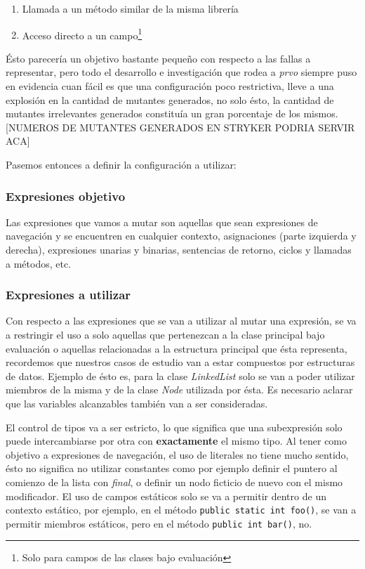 \begin{enumerate}[label=\arabic*), leftmargin=.75cm,align=left]
	\item Llamada a un m\'etodo similar de la misma librer\'ia
	\item Acceso directo a un campo\footnote{Solo para campos de las clases bajo evaluaci\'on}
\end{enumerate}

\'Esto parecer\'ia un objetivo bastante peque\~no con respecto a las fallas a representar, pero todo el desarrollo e investigaci\'on que rodea a \emph{prvo} siempre puso en evidencia cuan f\'acil es que una configuraci\'on poco restrictiva, lleve a una explosi\'on en la cantidad de mutantes generados, no solo \'esto, la cantidad de mutantes irrelevantes generados constitu\'ia un gran porcentaje de los mismos. [NUMEROS DE MUTANTES GENERADOS EN STRYKER PODRIA SERVIR ACA]

Pasemos entonces a definir la configuraci\'on a utilizar:

\subsubsection{Expresiones objetivo}

Las expresiones que vamos a mutar son aquellas que sean expresiones de navegaci\'on y se encuentren en cualquier contexto, asignaciones (parte izquierda y derecha), expresiones unarias y binarias, sentencias de retorno, ciclos y llamadas a m\'etodos, etc.

\subsubsection{Expresiones a utilizar}

Con respecto a las expresiones que se van a utilizar al mutar una expresi\'on, se va a restringir el uso a solo aquellas que pertenezcan a la clase principal bajo evaluaci\'on o aquellas relacionadas a la estructura principal que \'esta representa, recordemos que nuestros casos de estudio van a estar compuestos por estructuras de datos. Ejemplo de \'esto es, para la clase \emph{LinkedList} solo se van a poder utilizar miembros de la misma y de la clase \emph{Node} utilizada por \'esta. Es necesario aclarar que las variables alcanzables tambi\'en van a ser consideradas.

El control de tipos va a ser estricto, lo que significa que una subexpresi\'on solo puede intercambiarse por otra con \textbf{exactamente} el mismo tipo. Al tener como objetivo a expresiones de navegaci\'on, el uso de literales no tiene mucho sentido, \'esto no significa no utilizar constantes como por ejemplo definir el puntero al comienzo de la lista con \emph{final}, o definir un nodo ficticio de nuevo con el mismo modificador. El uso de campos est\'aticos solo se va a permitir dentro de un contexto est\'atico, por ejemplo, en el m\'etodo \lstinline|public static int foo()|, se van a permitir miembros est\'aticos, pero en el m\'etodo \lstinline|public int bar()|, no.

